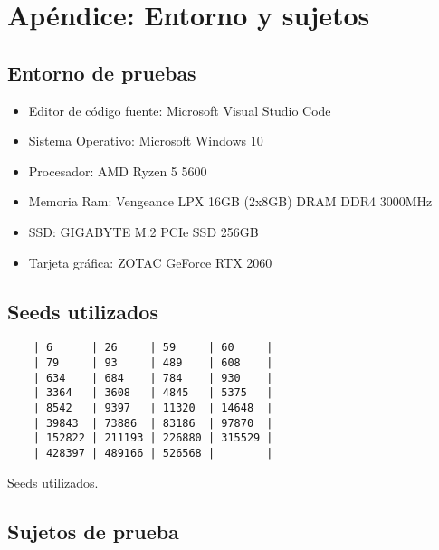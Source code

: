 \chapter{Apéndice: Entorno y sujetos}
\label{ch:entorno-sujetos}
\section*{Entorno de pruebas}
\begin{itemize}
    \item Editor de código fuente: Microsoft Visual Studio Code
    \item Sistema Operativo: Microsoft Windows 10
    \item Procesador: AMD Ryzen 5 5600
    \item Memoria Ram: Vengeance LPX 16GB (2x8GB) DRAM DDR4 3000MHz
    \item SSD: GIGABYTE M.2 PCIe SSD 256GB
    \item Tarjeta gráfica: ZOTAC GeForce RTX 2060
\end{itemize}

\section*{Seeds utilizados}
\begin{table}[ht]
    \centering
    \begin{verbatim}
    | 6      | 26     | 59     | 60     |
    | 79     | 93     | 489    | 608    |
    | 634    | 684    | 784    | 930    |
    | 3364   | 3608   | 4845   | 5375   |
    | 8542   | 9397   | 11320  | 14648  |
    | 39843  | 73886  | 83186  | 97870  |
    | 152822 | 211193 | 226880 | 315529 |
    | 428397 | 489166 | 526568 |        |
    \end{verbatim}
    \caption{Seeds utilizados.}
\end{table}
\newpage
\section*{Sujetos de prueba}

